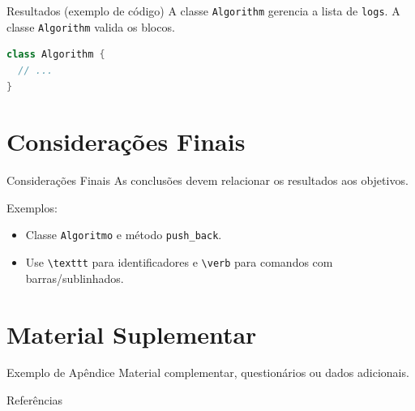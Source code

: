 \documentclass[aspectratio=169]{beamer}
\newcommand{\code}[1]{\texttt{#1}}
\begin{document}
\begin{frame}[fragile]{Resultados (exemplo de código)}
A classe \code{Algorithm} gerencia a lista de \code{logs}.  
A classe \lstinline!Algorithm! valida os blocos.
\begin{lstlisting}[language=Java, caption={Exemplo de classe}, label={lst:ex}]
class Algorithm {
  // ...
}
\end{lstlisting}
\end{frame}

\section{Considerações Finais}

\begin{frame}{Considerações Finais}
As conclusões devem relacionar os resultados aos objetivos.

Exemplos:
\begin{itemize}
  \item Classe \texttt{Algoritmo} e método \verb|push_back|.
  \item Use \texttt{\textbackslash texttt} para identificadores e \verb|\verb| para comandos com barras/sublinhados.
\end{itemize}
\end{frame}

\appendix
\renewcommand{\thesection}{Apêndice \Alph{section}}

\section{Material Suplementar}

\begin{frame}{Exemplo de Apêndice}\label{sec:apendiceA}
Material complementar, questionários ou dados adicionais.
\end{frame}

\begin{frame}[allowframebreaks]{Referências}
\printbibliography[heading=none]
\end{frame}
\end{document}
